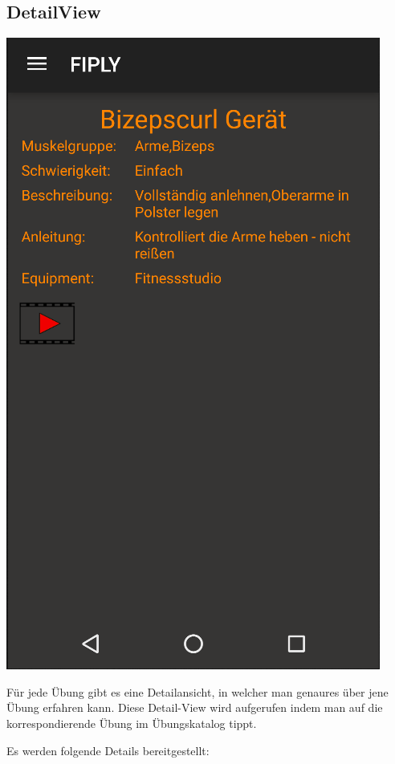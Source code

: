 \documentclass[FIPLY_base.tex]{subfiles}
\begin{document}
\subsection{DetailView}
\includegraphics[scale=0.4]{img/Uebungskatalog_detail}


Für jede Übung gibt es eine Detailansicht, in welcher man genaures über jene Übung erfahren kann.
Diese Detail-View wird aufgerufen indem man auf die korrespondierende Übung im Übungskatalog tippt.

Es werden folgende Details bereitgestellt:
\end{document}

